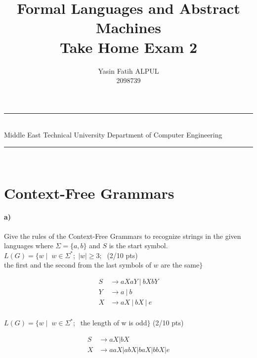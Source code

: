 \documentclass[a4paper,12pt]{article}
\title{Formal Languages and Abstract Machines \\ Take Home Exam 2}
\author{Yasin Fatih ALPUL \\ 2098739} %
\date{} %
\newcommand{\HRule}{\rule{\linewidth}{1mm}}
\begin{document}
\HRule\\
Middle East Technical University \hfill Department of Computer Engineering
{\let\newpage\relax\maketitle}
\HRule\\
\vspace{1cm}


\section{Context-Free Grammars \hfill {}}

\paragraph{a)} Give the rules of the Context-Free Grammars to recognize strings in the given languages where $\Sigma=\{a,b\}$ and $S$ is the start symbol. \\  

$L(G)=\{w \mid \;  w \in \Sigma^*;\; |w| \geq 3;\; $  \hfill \small{(2/10 pts)} \\
\hspace*{22mm} the first and the second from the last symbols of $w$ are the same$\}$ \\

\begin{tcolorbox}
\begin{align*}
    S & \rightarrow aXaY~|~bXbY\\
    Y & \rightarrow a~|~b\\
    X & \rightarrow aX~|~bX~|~e\\
\end{align*}
\end{tcolorbox}


$L(G)=\{w \mid \;  w \in \Sigma^*;\; $ the length of w is odd$\}$ \hfill \small{(2/10 pts)} \\

\begin{tcolorbox}
\begin{align*}
    S &\rightarrow aX | bX\\
    X &\rightarrow aaX | abX | baX | bbX | e
\end{align*}
\end{tcolorbox}
\end{document}
